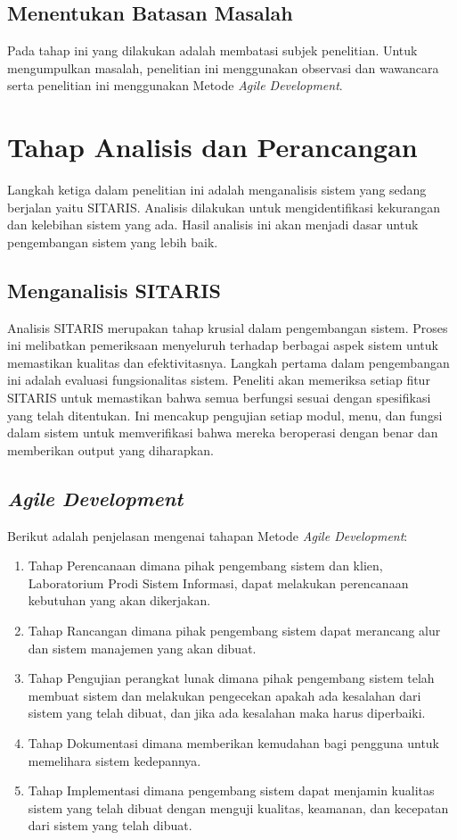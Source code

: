 \subsection{Menentukan Batasan Masalah}
Pada tahap ini yang dilakukan adalah membatasi subjek penelitian. Untuk mengumpulkan masalah, penelitian ini menggunakan observasi dan wawancara serta penelitian ini menggunakan Metode \textit{Agile Development}.

\section{Tahap Analisis dan Perancangan}
Langkah ketiga dalam penelitian ini adalah menganalisis sistem yang sedang berjalan yaitu SITARIS. Analisis dilakukan untuk mengidentifikasi kekurangan dan kelebihan sistem yang ada. Hasil analisis ini akan menjadi dasar untuk pengembangan sistem yang lebih baik.

\subsection{Menganalisis SITARIS}
Analisis SITARIS merupakan tahap krusial dalam pengembangan sistem. Proses ini melibatkan pemeriksaan menyeluruh terhadap berbagai aspek sistem untuk memastikan kualitas dan efektivitasnya. Langkah pertama dalam pengembangan ini adalah evaluasi fungsionalitas sistem. Peneliti akan memeriksa setiap fitur SITARIS untuk memastikan bahwa semua berfungsi sesuai dengan spesifikasi yang telah ditentukan. Ini mencakup pengujian setiap modul, menu, dan fungsi dalam sistem untuk memverifikasi bahwa mereka beroperasi dengan benar dan memberikan output yang diharapkan.

\subsection{\textit{Agile Development}}
Berikut adalah penjelasan mengenai tahapan Metode \textit{Agile Development}:
\begin{enumerate}
	\item Tahap Perencanaan dimana pihak pengembang sistem dan klien, Laboratorium Prodi Sistem Informasi, dapat melakukan perencanaan kebutuhan yang akan dikerjakan.
	\item Tahap Rancangan dimana pihak pengembang sistem dapat merancang alur dan sistem manajemen yang akan dibuat.
	\item Tahap Pengujian perangkat lunak dimana pihak pengembang sistem telah membuat sistem dan melakukan pengecekan apakah ada kesalahan dari sistem yang telah dibuat, dan jika ada kesalahan maka harus diperbaiki.
	\item Tahap Dokumentasi dimana memberikan kemudahan bagi pengguna untuk memelihara sistem kedepannya.
	\item Tahap Implementasi dimana pengembang sistem dapat menjamin kualitas sistem yang telah dibuat dengan menguji kualitas, keamanan, dan kecepatan dari sistem yang telah dibuat.
\end{enumerate}

